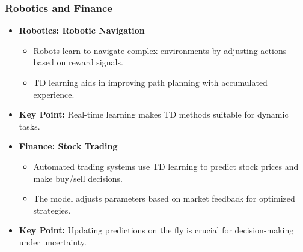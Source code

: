 \documentclass[aspectratio=169]{beamer}
\begin{document}
\begin{frame}[fragile]
    \frametitle{Robotics and Finance}
    \begin{itemize}
        \item \textbf{Robotics: Robotic Navigation}
        \begin{itemize}
            \item Robots learn to navigate complex environments by adjusting actions based on reward signals.
            \item TD learning aids in improving path planning with accumulated experience.
        \end{itemize}
        \item \textbf{Key Point:} Real-time learning makes TD methods suitable for dynamic tasks.
    \end{itemize}

    \begin{itemize}
        \item \textbf{Finance: Stock Trading}
        \begin{itemize}
            \item Automated trading systems use TD learning to predict stock prices and make buy/sell decisions.
            \item The model adjusts parameters based on market feedback for optimized strategies.
        \end{itemize}
        \item \textbf{Key Point:} Updating predictions on the fly is crucial for decision-making under uncertainty.
    \end{itemize}
\end{frame}
\end{document}
